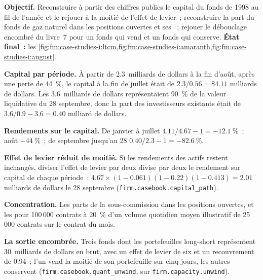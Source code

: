 \begin{tutorial}
\textbf{Objectif.} Reconstruire à partir des chiffres publics le capital du fonds de 1998 au fil de l'année et le rejouer à la moitié de l'effet de levier~; reconstruire la
part du fonds de gaz naturel dans les positions ouvertes et ses ~; rejouer le débouclage encombré du livre~7 pour un fonds qui vend et un fonds qui conserve.
\textbf{État final~:} les \cref{fig:fm:case-studies-i:ltcm,fig:fm:case-studies-i:amaranth,fig:fm:case-studies-i:august}.
\begin{tutsteps}
\item \textbf{Capital par période.} À partir de 2.3~milliards de dollars à la fin d'août, après une perte de 44~\%, le capital à la fin de juillet était de $2.3/0.56=\$4.11$
milliards de dollars. Les 3.6~milliards de dollars représentaient 90~\% de la valeur liquidative du 28 septembre, donc la part des investisseurs existants était de $3.6/0.9-3.6=0.40$ milliard de dollars.
\item \textbf{Rendements sur le capital.} De janvier à juillet $4.11/4.67-1=-12.1~\%$~; août $-44~\%$~; de septembre jusqu'au 28 $0.40/2.3-1=-82.6~\%$.
\item \textbf{Effet de levier réduit de moitié.} Si les rendements des actifs restent inchangés, diviser l'effet de levier par deux divise par deux le rendement sur capital de chaque période~:
$4.67\times(1-0.061)(1-0.22)(1-0.413)=2.01$ milliards de dollars le 28 septembre (\texttt{firm.casebook.capital\_path}).
\item \textbf{Concentration.} Les parts de la sous-commission dans les positions ouvertes, et les  pour 100\,000 contrats à 20~\% d'un volume quotidien moyen illustratif
de 25\,000 contrats sur le contrat du mois.
\item \textbf{La sortie encombrée.} Trois fonds dont les portefeuilles long-short représentent 30~milliards de dollars en brut, avec un effet de levier de six et un recouvrement de 0.94~; l'un vend la moitié
de son portefeuille sur cinq jours, les autres conservent (\texttt{firm.casebook.quant\_unwind}, sur \texttt{firm.capacity.unwind}).
\end{tutsteps}
\end{tutorial}

\label{lst:fm:case-studies-i:recon}

